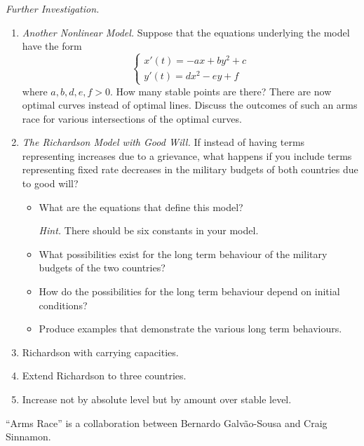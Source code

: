 \emph{Further Investigation.}
\begin{enumerate}[label=\emph{\arabic*.}]
\item \emph{Another Nonlinear Model.} Suppose that the equations underlying the model have the form
$$
\begin{cases}
x'(t) = -ax+by^2+c\\
y'(t) =dx^2-ey+f	
\end{cases}
$$
where $a,b,d,e,f>0$. How many stable points are there? 
There are now optimal curves instead of optimal lines. 
Discuss the outcomes of such an arms race for various intersections of the optimal curves.

\item \emph{The Richardson Model with Good Will.} If instead of having terms representing increases due to a grievance, what happens if you include terms representing fixed rate decreases in the military budgets of both countries due to good will?
\begin{itemize}
\item What are the equations that define this model? 

\emph{Hint.} There should be six constants in your model.

\item What possibilities exist for the long term behaviour of the military budgets of the two countries?
\item How do the possibilities for the long term behaviour depend on initial conditions?
\item Produce examples that demonstrate the various long term behaviours.
\end{itemize}

\item Richardson with carrying capacities.

\item Extend Richardson to three countries.

\item Increase not by absolute level but by amount over stable level.
\end{enumerate}

\hfill ``Arms Race'' is a collaboration between Bernardo Galv\~ao-Sousa and Craig Sinnamon.
\begin{noexercises}
\end{noexercises}
